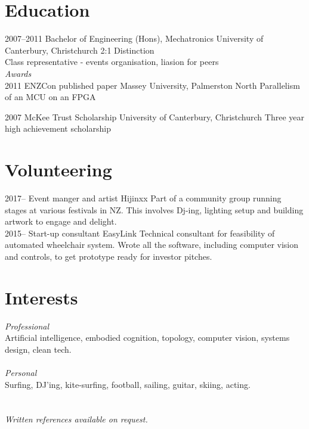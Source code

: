 \documentclass[print]{friggeri-cv} %
\begin{document}
\section{Education}
\begin{entrylist}
\entry
{2007--2011}
{Bachelor of Engineering (Hons), Mechatronics}
{University of Canterbury, Christchurch}
{2:1 Distinction\\
Class representative - events organisation, liasion for peers}\\

\emph{Awards}\\
\entry
{2011}
{ENZCon published paper}
{Massey University, Palmerston North}
{Parallelism of an MCU on an FPGA}

\entry
{2007}
{McKee Trust Scholarship}
{University of Canterbury, Christchurch}
{Three year high achievement scholarship}
\end{entrylist}

\section{Volunteering}
\begin{entrylist}
\entry 
{2017-- }
{Event manger and artist}
{Hijinxx}
{Part of a community group running stages at various festivals in NZ. This involves Dj-ing, lighting setup and building artwork to engage and delight.} \\
\entry
{2015--}
{Start-up consultant}
{EasyLink}
{Technical consultant for feasibility of automated wheelchair system. Wrote all the software, including computer vision and controls, to get prototype ready for investor pitches.}
\end{entrylist}

\section{Interests}
\emph{Professional}\\ Artificial intelligence, embodied cognition, topology, computer vision, systems design, clean tech.\\
\\
\emph{Personal}\\ Surfing, DJ'ing, kite-surfing, football, sailing, guitar, skiing, acting.
\\ \\ \\ 
\emph{Written references available on request.}
\end{document}
